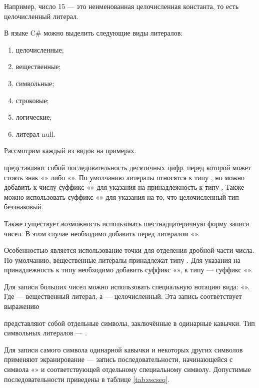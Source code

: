 Например, число 15 — это неименованная целочисленная константа, то
есть целочисленный литерал.

В языке C\# можно выделить следующие виды литералов:
\begin{enumerate}
\item целочисленные;
\item вещественные;
\item символьные;
\item строковые;
\item логические;
\item литерал null.
\end{enumerate}

Рассмотрим каждый из видов на примерах.


 представляют
собой последовательность десятичных цифр, перед которой может стоять
знак «\Lst{+}» либо «\Lst{-}». По умолчанию литералы относятся к
типу , но можно добавить к числу суффикс «» для
указания на принадлежность к типу . Также можно
использовать суффикс «» для указания на то, что
целочисленный тип беззнаковый. %

Также существует возможность использовать шестнадцатеричную форму
записи чисел. В этом случае необходимо добавить перед литералом
«».


Особенностью 
является использование точки для отделения дробной части числа. По
умолчанию, вещественные литералы принадлежат типу . Для
указания на принадлежность к типу  необходимо добавить
суффикс «», к типу  — суффикс «».

Для записи больших чисел можно использовать специальную нотацию вида:
«».  Где
 — вещественный литерал, а
 — целочисленный. Эта запись соответствует
выражению


 представляют собой
отдельные символы, заключённые в одинарные кавычки. Тип символьных
литералов — .

Для записи самого символа одинарной кавычки и некоторых других
символов применяют экранирование — запись последовательности,
начинающейся с символа «\Lst{\textbackslash{}}» и соответствующей
отдельному специальному символу. Допустимые последовательности
приведены в таблице \ref{tab:escseq}.

